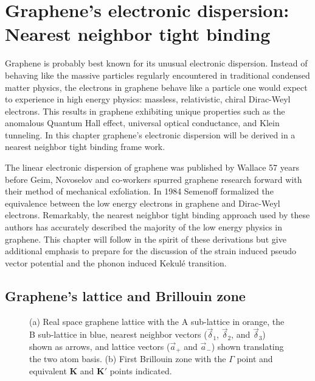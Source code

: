 \chapter{Graphene's electronic dispersion: Nearest neighbor tight binding\label{chap:TightBinding}}

Graphene is probably best known for its unusual electronic dispersion\cite{CastroNeto2009}.  Instead of behaving like the massive particles regularly encountered in traditional condensed matter physics, the electrons in graphene behave like a particle one would expect to experience in high energy physics: massless, relativistic, chiral Dirac-Weyl electrons\cite{Wallace1947,Semenoff1984}.  This results in graphene exhibiting unique properties such as the anomalous Quantum Hall effect\cite{Zhang2005,Novoselov2005a}, universal optical conductance\cite{Nair2008,Mak2008}, and Klein tunneling\cite{Beenakker2008,Young2009}.  In this chapter graphene's electronic dispersion will be derived in a nearest neighbor tight binding frame work.

The linear electronic dispersion of graphene was published by Wallace\cite{Wallace1947} 57 years before Geim, Novoselov and co-workers spurred graphene research forward with their method of mechanical exfoliation\cite{Novoselov2004}.  In 1984 Semenoff formalized the equivalence between the low energy electrons in graphene and Dirac-Weyl electrons.  Remarkably, the nearest neighbor tight binding approach used by these authors has accurately described the majority of the low energy physics in graphene.  This chapter will follow in the spirit of these derivations but give additional emphasis to prepare for the discussion of the strain induced pseudo vector potential and the phonon induced Kekul\'e transition.

\section{Graphene's lattice and Brillouin zone}
\begin{figure}
	\begin{center}
	
	\end{center}
	\caption{\label{fig:TB:geometry} (a) Real space graphene lattice with the A sub-lattice in orange, the B sub-lattice in blue, nearest neighbor vectors ($\vec \delta_1$, $\vec \delta_2$, and $\vec \delta_3$) shown as arrows, and lattice vectors ($\vec a_+$ and $\vec a_-$) shown translating the two atom basis. (b) First Brillouin zone with the $\Gamma$ point and equivalent $\bm{K}$ and $\bm{K'}$ points indicated.}
\end{figure}

